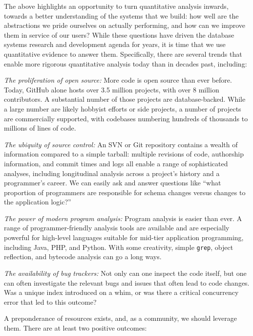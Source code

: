  The above highlights an opportunity to turn quantitative analysis inwards, towards a better understanding of the systems that we build: how well are the abstractions we pride ourselves on actually performing, and how can we improve them in service of our users? While these questions have driven the database systems research and development agenda for years, it is time that we use quantitative evidence to answer them. Specifically, there are several trends that enable more rigorous quantitative analysis today than in decades past, including:
\begin{enumeratetwo}

\item \textit{The proliferation of open source:} More code is open source than ever before. Today, GitHub alone hosts over 3.5 million projects, with over 8 million contributors. A substantial number of those projects are database-backed. While a large number are likely hobbyist efforts or side projects, a number of projects are commercially supported, with codebases numbering hundreds of thousands to millions of lines of code.

\item\textit{The ubiquity of source control:} An SVN or Git repository contains a wealth of information compared to a simple tarball: multiple revisions of code, authorship information, and commit times and logs all enable a range of sophisticated analyses, including longitudinal analysis across a project's history and a programmer's career. We can easily ask and answer questions like ``what proportion of programmers are responsible for schema changes versus changes to the application logic?''

\item\textit{The power of modern program analysis:} Program analysis is easier than ever. A range of programmer-friendly analysis tools are available and are especially powerful for high-level languages suitable for mid-tier application programming, including Java, PHP, and Python. With some creativity, simple \texttt{grep}, object reflection, and bytecode analysis can go a long ways.

\item\textit{The availability of bug trackers:} Not only can one inspect the code itself, but one can often investigate the relevant bugs and issues that often lead to code changes. Was a unique index introduced on a whim, or was there a critical concurrency error that led to this outcome?\vspace{-.25em}
\end{enumeratetwo}
A preponderance of resources exists, and, as a community, we should leverage them. There are at least two positive outcomes:

